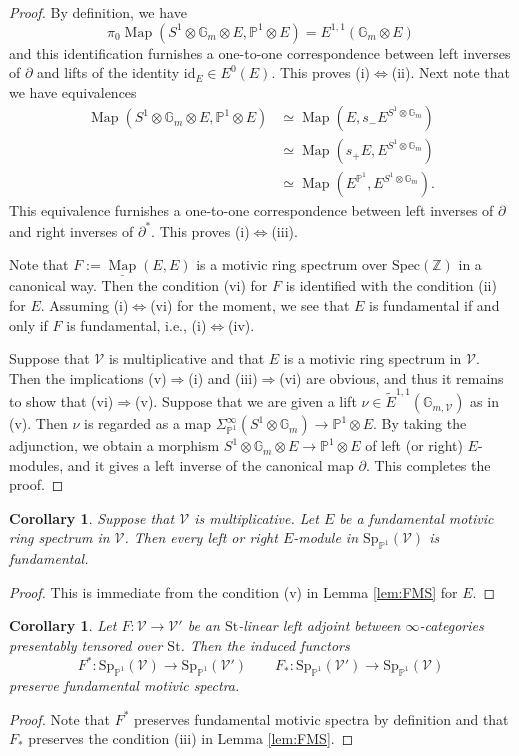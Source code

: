 \documentclass{amsart}
\theoremstyle{plain}
\newtheorem{corollary}[theorem]{Corollary}
\theoremstyle{definition}
\theoremstyle{remark}
\numberwithin{equation}{theorem}
\newcommand{\mbb}[1]{\mathbb{#1}}
\newcommand{\Spec}{\mathrm{Spec}}
\newcommand{\St}{\mathrm{St}}
\newcommand{\V}{\mathcal{V}}
\newcommand{\id}{\mathrm{id}}
\newcommand{\SigmaP}{\Sigma_{\mathbb{P}^1}}
\newcommand{\SpP}{\mathrm{Sp}_{\mathbb{P}^1}}
\newcommand{\Map}{\operatorname{Map}}
\newcommand{\intMap}{\underline{\Map}}
\begin{document}
\begin{proof}
By definition, we have
\[
	\pi_0\Map(S^1\otimes\mbb{G}_m\otimes E,\mbb{P}^1\otimes E) = E^{1,1}(\mbb{G}_m\otimes E)
\]
and this identification furnishes a one-to-one correspondence between left inverses of $\partial$ and lifts of the identity $\id_E\in E^0(E)$.
This proves (i)$\Leftrightarrow$(ii).
Next note that we have equivalences
\[
\begin{split}
	\Map(S^1\otimes\mbb{G}_m\otimes E,\mbb{P}^1\otimes E)
	&\simeq \Map(E,s_-E^{S^1\otimes\mbb{G}_m}) \\
	&\simeq \Map(s_+E,E^{S^1\otimes\mbb{G}_m}) \\
	&\simeq \Map(E^{\mbb{P}^1},E^{S^1\otimes\mbb{G}_m}).
\end{split}
\]
This equivalence furnishes a one-to-one correspondence between left inverses of $\partial$ and right inverses of $\partial^*$.
This proves (i)$\Leftrightarrow$(iii).

Note that $F:=\intMap(E,E)$ is a motivic ring spectrum over $\Spec(\mbb{Z})$ in a canonical way.
Then the condition (vi) for $F$ is identified with the condition (ii) for $E$.
Assuming (i)$\Leftrightarrow$(vi) for the moment, we see that $E$ is fundamental if and only if $F$ is fundamental, i.e., (i)$\Leftrightarrow$(iv).

Suppose that $\V$ is multiplicative and that $E$ is a motivic ring spectrum in $\V$.
Then the implications (v)$\Rightarrow$(i) and (iii)$\Rightarrow$(vi) are obvious, and thus it remains to show that (vi)$\Rightarrow$(v).
Suppose that we are given a lift $\nu\in\tilde{E}^{1,1}(\mbb{G}_{m,\V})$ as in (v).
Then $\nu$ is regarded as a map $\SigmaP^\infty(S^1\otimes\mbb{G}_m)\to\mbb{P}^1\otimes E$.
By taking the adjunction, we obtain a morphism $S^1\otimes\mbb{G}_m\otimes E\to\mbb{P}^1\otimes E$ of left (or right) $E$-modules, and it gives a left inverse of the canonical map $\partial$.
This completes the proof.
\end{proof}

\begin{corollary}\label{cor:FMS}
Suppose that $\V$ is multiplicative.
Let $E$ be a fundamental motivic ring spectrum in $\V$.
Then every left or right $E$-module in $\SpP(\V)$ is fundamental.
\end{corollary}
\begin{proof}
This is immediate from the condition (v) in Lemma \ref{lem:FMS} for $E$.
\end{proof}

\begin{corollary}\label{cor:FMS2}
Let $F\colon\V\to\V'$ be an $\St$-linear left adjoint between $\infty$-categories presentably tensored over $\St$.
Then the induced functors
\[
	F^* \colon \SpP(\V) \to \SpP(\V') \qquad
	F_* \colon \SpP(\V') \to \SpP(\V) 
\]
preserve fundamental motivic spectra.
\end{corollary}
\begin{proof}
Note that $F^*$ preserves fundamental motivic spectra by definition and that $F_*$ preserves the condition (iii) in Lemma \ref{lem:FMS}.
\end{proof}
\end{document}
